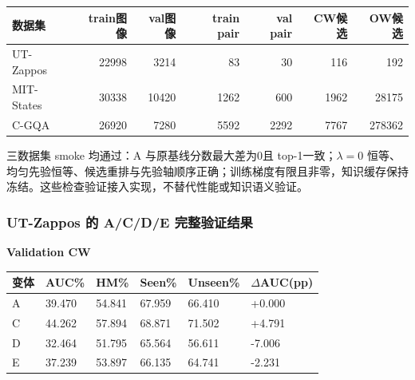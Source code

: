 \documentclass[12pt,a4paper,UTF8]{ctexart}
\newenvironment{reporttable}{\par\smallskip\begingroup\small\centering}{\par\endgroup\smallskip}
\begin{document}
\begin{reporttable}

\footnotesize

\begin{tabularx}{\linewidth}{|Y|r|r|r|r|r|r|}
\hline

\textbf{数据集} & \textbf{train图像} & \textbf{val图像} & \textbf{train pair} & \textbf{val pair} & \textbf{CW候选} & \textbf{OW候选} \\ \hline

UT-Zappos & 22998 & 3214 & 83 & 30 & 116 & 192 \\ \hline

MIT-States & 30338 & 10420 & 1262 & 600 & 1962 & 28175 \\ \hline

C-GQA & 26920 & 7280 & 5592 & 2292 & 7767 & 278362 \\ \hline

\end{tabularx}\end{reporttable}

三数据集 smoke 均通过：A 与原基线分数最大差为0且 top-1一致；$\lambda=0$ 恒等、均匀先验恒等、候选重排与先验轴顺序正确；训练梯度有限且非零，知识缓存保持冻结。这些检查验证接入实现，不替代性能或知识语义验证。

\subsubsection{UT-Zappos 的 A/C/D/E 完整验证结果}

\noindent\textbf{Validation CW}\par\nopagebreak[4]

\begin{reporttable}

\begin{tabularx}{\linewidth}{|Z|Z|Z|Z|Z|Z|}
\hline

\textbf{变体} & \textbf{AUC\%} & \textbf{HM\%} & \textbf{Seen\%} & \textbf{Unseen\%} & \textbf{$\Delta$AUC(pp)} \\ \hline

A & 39.470 & 54.841 & 67.959 & 66.410 & +0.000 \\ \hline

C & 44.262 & 57.894 & 68.871 & 71.502 & +4.791 \\ \hline

D & 32.464 & 51.795 & 65.564 & 56.611 & -7.006 \\ \hline

E & 37.239 & 53.897 & 66.135 & 64.741 & -2.231 \\ \hline

\end{tabularx}\end{reporttable}
\end{document}
